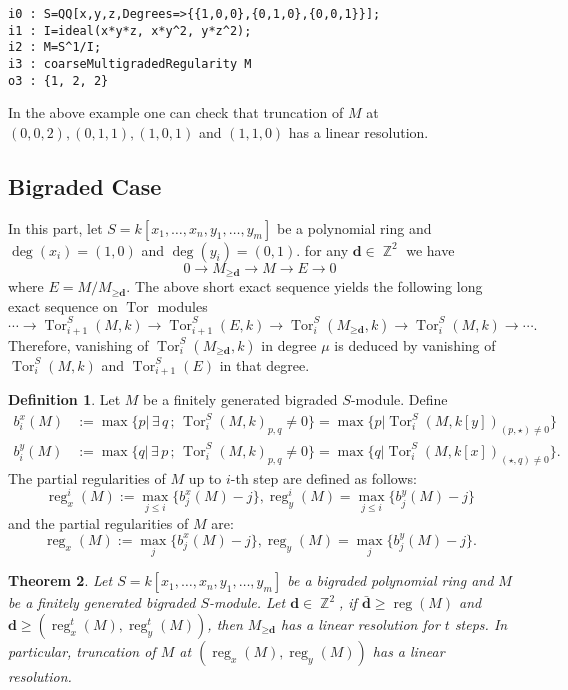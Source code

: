 \documentclass[11pt]{amsart}
\DeclareMathOperator{\reg}{reg}
\DeclareMathOperator{\tor}{Tor}
\DeclareMathOperator{\Tor}{Tor}
\DeclareMathOperator{\Z}{\mathbb{Z}}
\newtheorem{thm}{Theorem}[section]
\theoremstyle{definition}
\newtheorem{dfn}[thm]{Definition}
\begin{document}
  \begin{footnotesize}
 \begin{verbatim}
i0 : S=QQ[x,y,z,Degrees=>{{1,0,0},{0,1,0},{0,0,1}}];
i1 : I=ideal(x*y*z, x*y^2, y*z^2);
i2 : M=S^1/I;
i3 : coarseMultigradedRegularity M
o3 : {1, 2, 2}
\end{verbatim}
\end{footnotesize}
In  the above example one can check that truncation of $M$ at $(0,0,2), (0,1,1), (1,0,1) $ and $(1,1,0)$ has a linear resolution. 

\subsection*{Bigraded Case} In this part, let $S=k[x_1,\dots,x_n,y_1,\dots,y_m]$ be a polynomial ring and $\deg(x_i)=(1,0)$ and $\deg(y_i)=(0,1)$.   for any $\textbf{d}\in \Z^2$ we have
$$
0\rightarrow M_{\geq \textbf{d}} \rightarrow M\rightarrow E\rightarrow 0
$$
where $E= M/M_{\geq \textbf{d}}$. The above short exact sequence yields the following long exact sequence on $\Tor$ modules
$$
\cdots \rightarrow \Tor_{i+1}^S(M,k)\rightarrow \Tor_{i+1}^S(E,k)\rightarrow 
\Tor_i^S({M_{\geq \textbf{d}}},k)\rightarrow \Tor_i^S(M,k)\rightarrow \cdots .
$$
Therefore, vanishing of $\tor_i^S(M_{\geq \textbf{d}},k)$ in degree $\mu$ is deduced by vanishing of $\tor_i^S(M,k)$ and $\tor_{i+1}^S(E)$ in that degree. 
\begin{dfn}
Let $M$ be a finitely generated bigraded $S$-module. Define
\begin{align*}
b_i^x(M) &:= \max \lbrace p \vert \, \exists \,q \,;\,  \tor_{i}^S(M,k)_{p,q}\neq 0\rbrace = \max \lbrace p \vert \tor_i^S(M, k[y])_{(p,\star)\neq 0}\rbrace\\
b_i^y(M) &:= \max \lbrace q \vert \, \exists \,p \,;\, \tor_{i}^S(M,k)_{p,q}\neq 0\rbrace= \max \lbrace q \vert \tor_i^S(M, k[x])_{(\star,q)\neq 0}\rbrace.
\end{align*}
The partial regularities of $M$ up to $i$-th step are defined as follows:
$$
\reg^i _x(M) := \max_{j\leq i} \lbrace b_j^x(M)-j\rbrace, \reg^i_y(M) = \max_{j\leq i}\lbrace b_j^y(M)-j\rbrace
$$
and  the partial regularities of $M$ are:
$$
\reg _x(M) := \max_{j} \lbrace b_j^x(M)-j\rbrace, \reg_y(M) = \max_{j}\lbrace b_j^y(M)-j\rbrace.
$$
\end{dfn}
\begin{thm}\label{r=2}
Let $S=k[x_1,\dots,x_n,y_1,\dots, y_m]$ be a bigraded polynomial ring and $M$ be a finitely generated bigraded $S$-module.  Let $\textbf{d}\in \Z^2$, if $\bar{\textbf{d}}\geq \reg(M)$ and $ \textbf{d} \geq  (\reg^t_x(M),\reg^t_y(M))$, then  
$M_{\geq \textbf{d}}$ has a linear resolution for $t$ steps. In particular, truncation of $M$ at $(\reg_x(M),\reg_y(M))$ has a linear resolution.
\end{thm}
\end{document}
